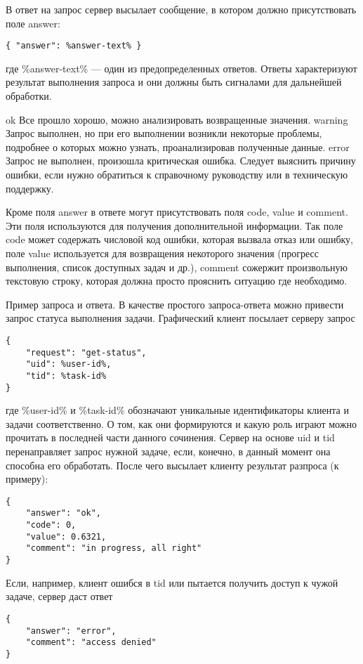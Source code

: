 В ответ на запрос сервер высылает сообщение, в котором должно присутствовать поле answer:
\begin{verbatim}
{ "answer": %answer-text% }
\end{verbatim}
где \%answer-text\% --- один из предопределенных ответов. Ответы характеризуют результат выполнения запроса и они должны быть сигналами для дальнейшей обработки.

ok
	Все прошло хорошо, можно анализировать возвращенные значения.
	warning
	Запрос выполнен, но при его выполнении возникли некоторые проблемы, подробнее о которых можно узнать, проанализировав полученные данные.
	error
	Запрос не выполнен, произошла критическая ошибка. Следует выяснить причину ошибки, если нужно обратиться к справочному руководству или в техническую поддержку.
	
	Кроме поля answer в ответе могут присутствовать поля code, value и comment. Эти поля используются для получения дополнительной информации. Так поле code может содержать числовой код ошибки, которая вызвала отказ или ошибку, поле value используется для возвращения некоторого значения (прогресс выполнения, список доступных задач и др.), comment сожержит произвольную текстовую строку, которая должна просто прояснить ситуацию где необходимо.
	
Пример запроса и ответа. В качестве простого запроса-ответа можно привести запрос статуса выполнения задачи. Графический клиент посылает серверу запрос
\begin{verbatim}
{   
    "request": "get-status", 
    "uid": %user-id%, 
    "tid": %task-id%
}
\end{verbatim}
где \%user-id\% и \%task-id\% обозначают уникальные идентификаторы клиента и задачи соответственно. О том, как они формируются и какую роль играют можно прочитать в последней части данного сочинения.
Сервер на основе uid и tid перенаправляет запрос нужной задаче, если, конечно, в данный момент она способна его обработать. После чего высылает клиенту результат разпроса (к примеру):
\begin{verbatim}
{
    "answer": "ok",
    "code": 0,
    "value": 0.6321,
    "comment": "in progress, all right"
}
\end{verbatim}
Если, например, клиент ошибся в tid или пытается получить доступ к чужой задаче, сервер даст ответ
\begin{verbatim}
{
    "answer": "error",
    "comment": "access denied"
}
\end{verbatim}
        
